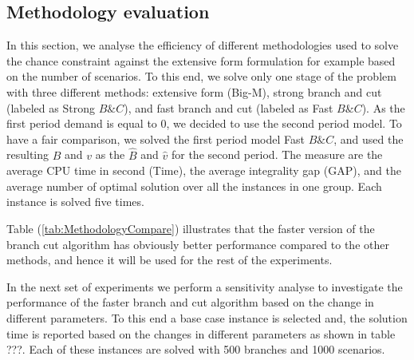 \documentclass[10pt]{article}
\newcommand{\Bi}{B} %
\newcommand{\Vi}{v} %
\begin{document}
\subsection{Methodology evaluation}
In this section, we analyse the efficiency of different methodologies used to solve the chance constraint against the extensive form formulation for example based on the number of scenarios. To this end, we solve only one stage of the problem with three different methods: extensive form (Big-M), strong branch and cut (labeled as Strong $B\& C$), and fast branch and cut (labeled as Fast $B\&C$). As the first period demand is equal to 0, we decided to use the second period model. To have a fair comparison, we solved the first period model Fast $B\&C$, and used the resulting ${\Bi}$ and ${\Vi}$ as the $\hat{\Bi}$ and $\hat{\Vi}$ for the second period. The measure are the average CPU time in second (Time), the average integrality gap (GAP), and the average number of optimal solution over all the instances in one group. Each instance is solved five times.

Table (\ref{tab:MethodologyCompare}) illustrates that the faster version of the branch cut algorithm has obviously better performance compared to the other methods, and hence it will be used for the rest of the experiments.

In the next set of experiments we perform a sensitivity analyse to investigate the performance of the faster branch and cut algorithm based on the change in different parameters. To this end a base case instance is selected and, the solution time is reported based on the changes in different parameters as shown in table ???. 
Each of these instances are solved with 500 branches and 1000 scenarios. 
\end{document}
